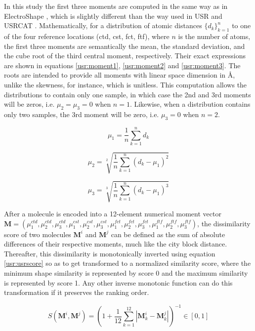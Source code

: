 In this study the first three moments are computed in the same way as in ElectroShape \citep{1337}, which is slightly different than the way used in USR \citep{1379,1332,1380} and USRCAT \citep{1331}. Mathematically, for a distribution of atomic distances $\{d_k\}_{k=1}^n$ to one of the four reference locations (ctd, cst, fct, ftf), where $n$ is the number of atoms, the first three moments are semantically the mean, the standard deviation, and the cube root of the third central moment, respectively. Their exact expressions are shown in equations \eqref{usr:moment1}, \eqref{usr:moment2} and \eqref{usr:moment3}. The roots are intended to provide all moments with linear space dimension in \AA, unlike the skewness, for instance, which is unitless. This computation allows the distributions to contain only one sample, in which case the 2nd and 3rd moments will be zeros, i.e. $\mu_2=\mu_3=0$ when $n=1$. Likewise, when a distribution contains only two samples, the 3rd moment will be zero, i.e. $\mu_3=0$ when $n=2$.

\begin{equation}
\mu_1=\frac{1}{n}\sum_{k=1}^{n}{d_k}
\label{usr:moment1}
\end{equation}

\begin{equation}
\mu_2=\sqrt[2]{\frac{1}{n}\sum_{k=1}^{n}{(d_k-\mu_1)^2}}
\label{usr:moment2}
\end{equation}

\begin{equation}
\mu_3=\sqrt[3]{\frac{1}{n}\sum_{k=1}^{n}{(d_k-\mu_1)^3}}
\label{usr:moment3}
\end{equation}

After a molecule is encoded into a 12-element numerical moment vector $\mathbf M=(\mu_1^{ctd}, \mu_2^{ctd}, \mu_3^{ctd}, \mu_1^{cst}, \mu_2^{cst}, \mu_3^{cst}, \mu_1^{fct}, \mu_2^{fct}, \mu_3^{fct}, \mu_1^{ftf}, \mu_2^{ftf}, \mu_3^{ftf})$, the dissimilarity score of two molecules $\mathbf M^i$ and $\mathbf M^j$ can be defined as the sum of absolute differences of their respective moments, much like the city block distance. Thereafter, this dissimilarity is monotonically inverted using equation \eqref{usr:usrscore} so as to get transformed to a normalized similarity score, where the minimum shape similarity is represented by score 0 and the maximum similarity is represented by score 1. Any other inverse monotonic function can do this transformation if it preserves the ranking order.

\begin{equation}
S(\mathbf M^i, \mathbf M^j)=(1+\frac{1}{12}\sum_{k=1}^{12}|\mathbf M_k^i-\mathbf M_k^j|)^{-1}\in[0, 1]
\label{usr:usrscore}
\end{equation}

